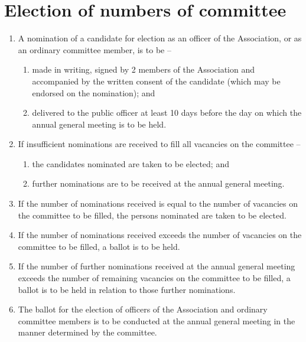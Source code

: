 \documentclass[a4paper,11pt]{article}
\begin{document}
\section{Election of numbers of committee}
\begin{enumerate}
	\item A nomination of a candidate for election as an officer of the Association, or as an ordinary committee member, is to be --
	\begin{enumerate}
		\item made in writing, signed by 2 members of the Association and accompanied by the written consent of the candidate (which may be endorsed on the nomination); and
		\item delivered to the public officer at least 10 days before the day on which the annual general meeting is to be held.
	\end{enumerate}
	
	\item If insufficient nominations are received to fill all vacancies on the committee --
	\begin{enumerate}
		\item the candidates nominated are taken to be elected; and
		\item further nominations are to be received at the annual general meeting.
	\end{enumerate}
	
	\item If the number of nominations received is equal to the number of vacancies on the committee to be filled, the persons nominated are taken to be elected.
	\item If the number of nominations received exceeds the number of vacancies on the committee to be filled, a ballot is to be held.
	\item If the number of further nominations received at the annual general meeting exceeds the number of remaining vacancies on the committee to be filled, a ballot is to be held in relation to those further nominations.
	\item The ballot for the election of officers of the Association and ordinary committee members is to be conducted at the annual general meeting in the manner determined by the committee.
\end{enumerate}
\end{document}
